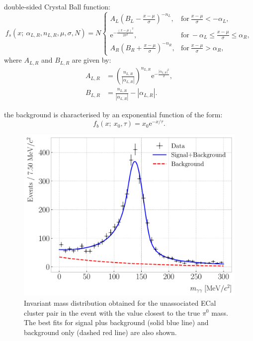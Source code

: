 double-sided Crystal Ball function:
\begin{equation}
    f_{s} (x; ~\alpha_{L,R}, n_{L,R}, \mu, \sigma, N) = N \left\{
    \begin{array}{ll}
        A_{L} \left(B_{L} - \frac{x - \mu}{\sigma}\right)^{-n_{L}}, & \mathrm{for} \ \frac{x - \mu}{\sigma} < -\alpha_{L},\\
        \mathrm{e}^{-\frac{(x-\mu)^{2}}{2 \sigma^{2}}}, & \mathrm{for} \ -\alpha_{L} \leq \frac{x - \mu}{\sigma} \leq \alpha_{R},\\
        A_{R} \left(B_{R} + \frac{x - \mu}{\sigma}\right)^{-n_{R}}, & \mathrm{for} \ \frac{x - \mu}{\sigma} > \alpha_{R},
    \end{array}
    \right.
\end{equation}
where $A_{L,R}$ and $B_{L,R}$ are given by:
\begin{equation}
\begin{split}
    A_{L,R} &= \left(\frac{n_{L,R}}{|\alpha_{L,R}|}\right)^{n_{L,R}} \mathrm{e}^{-\frac{|\alpha_{L,R}|^{2}}{2}},\\
    B_{L,R} &= \frac{n_{L,R}}{|\alpha_{L,R}|}-|\alpha_{L,R}|.
\end{split}
\end{equation}

the background is characterised by an exponential function of the form:
\begin{equation}
    f_{b} (x; ~x_{0}, \tau) = x_{0} \mathrm{e}^{-x/\tau}.
\end{equation}

\begin{figure}[t]
    \centering
    \includegraphics[width=.80\linewidth]{Images/GAr_selection/numuCC_1pizero_selection_biased.pdf}
    \caption[Invariant mass distribution obtained for the unassociated ECal cluster pair in the event with the value closest to the true $\pi^{0}$ mass.]{Invariant mass distribution obtained for the unassociated ECal cluster pair in the event with the value closest to the true $\pi^{0}$ mass. The best fits for signal plus background (solid blue line) and background only (dashed red line) are also shown.}
    \label{fig:pizero_invariant_mass_biased}
\end{figure}

